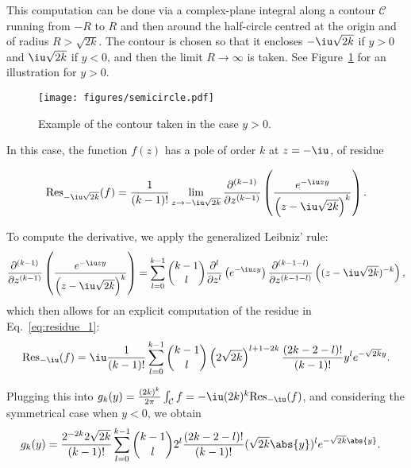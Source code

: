 This computation can be done via a complex-plane integral along a contour $\mathcal{C}$ running from $-R$ to $R$ and then around the half-circle centred at the origin and of radius $R>\sqrt{2k}$. The contour is chosen so that it encloses $-\iu\sqrt{2k}$ if $y>0$ and $\iu\sqrt{2k}$ if $y<0$, and then the limit $R\to\infty$ is taken. See Figure~\ref{fig:contour} for an illustration for $y>0$.

\begin{figure}[tb]
    \centering
    \texttt{[image: figures/semicircle.pdf]}
    \caption{Example of the contour taken in the case $y>0$.}
    \label{fig:contour}
\end{figure}

In this case, the function $f(z)$ has a pole of order $k$ at $z=-\iu$, of residue

\begin{equation}\label{eq:residue_1}
\mbox{Res}_{-\iu\sqrt{2k}}(f) = \frac{1}{(k-1)!}\lim_{z\to -\iu\sqrt{2k}} \frac{\partial^{(k-1)}}{\partial z^{(k-1)}}\left(\frac{e^{-\iu z y}}{\left(z-\iu\sqrt{2k}\right)^k }\right). 
\end{equation}


To compute the derivative, we apply the generalized Leibniz' rule:
\begin{equation}\label{eq:leib_rule}
\frac{\partial^{(k-1)}}{\partial z^{(k-1)}}\left(\frac{e^{-\iu z y}}{\left(z-\iu\sqrt{2k}\right)^k }\right)= \sum_{l=0}^{k-1}\binom{k-1}{l}\frac{\partial^l}{\partial z^l}\left(e^{-\iu z y}\right)\frac{\partial^{(k-1-l)}}{\partial z^{(k-1-l)}} \left((z-\iu\sqrt{2k})^{-k}\right),
\end{equation}
which then allows for an explicit computation of the residue in Eq.~\eqref{eq:residue_1}:
\begin{equation}\label{eq:full_residue}
\mbox{Res}_{-\iu}(f)= \iu\frac{1}{\left(k-1\right)!}\sum_{l=0}^{k-1}\binom{k-1}{l} \left(2\sqrt{2k}\right)^{l+1-2k} \frac{(2k-2-l)!}{(k-1)!} y^l e^{-\sqrt{2k}y}.
\end{equation}

Plugging this into $g_k(y)=\frac{(2k)^k}{2\pi}\int_{\mathcal{C}}f=-\iu (2k)^k \mbox{Res}_{-\iu}(f)$, and considering the symmetrical case when $y<0$, we obtain
\begin{equation}\label{eq:full_result}
\begin{split}
g_k(y) &= \frac{2^{-2k}2\sqrt{2k}}{\left(k-1\right)!}\sum_{l=0}^{k-1}\binom{k-1}{l} 2^l \frac{(2k-2-l)!}{(k-1)!} (\sqrt{2k}\abs{y})^l e^{-\sqrt{2k}\abs{y}}.
\end{split}
\end{equation}

